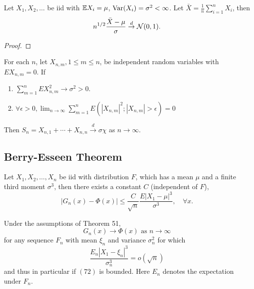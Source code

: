 \begin{theorem}\label{thm:classic-central-limit-theorem}
	Let \(X_1,X_2,\ldots\) be iid with \(\mathbb{E} X_{i}=\mu\), \(\mathrm{Var}(X_{i})=\sigma^2<\infty\). Let \(\bar{X}=\frac{1}{n}\sum_{i=1}^{n}X_{i}\), then
	\begin{equation}
		n^{1/2}\frac{\bar{X}-\mu}{\sigma}\stackrel{d}{\rightarrow}\mathcal{N}(0,1).
	\end{equation}
\end{theorem}

\begin{proof}

\end{proof}

\begin{theorem}
	For each \(n\), let \(X_{n,m},1\leq m\leq n\), be independent random variables with \(EX_{n,m}=0\). If
	\begin{enumerate}
		\item \(\sum_{m=1}^{n}EX_{n,m}^{2} \rightarrow \sigma^{2}>0\).
		\item \(\forall\epsilon>0,\lim_{n\rightarrow\infty}\sum_{m=1}^{n}E\left(\left|X_{n,m}\right|^{2};\left|X_{n,m}\right|>\epsilon\right)=0\)
	\end{enumerate}
	Then \(S_{n}=X_{n,1}+\cdots+X_{n,n}\stackrel{d}{\rightarrow}\sigma\chi\) as \(n\rightarrow\infty\).
\end{theorem}

\subsection{Berry-Esseen Theorem}

\begin{theorem}
	Let \(X_{1},X_{2},\ldots,X_{n}\) be iid with distribution \(F\), which has a mean \(\mu\) and a finite third moment \(\sigma^{3}\), then there exists a constant \(C\) (independent of \(F\)),
	\begin{equation}
		\left|G_{n}(x)-\Phi(x)\right|\leq\frac{C}{\sqrt{n}}\frac{E\left|X_{1}-\mu\right|^{3}}{\sigma^{3}},\quad\forall x.
	\end{equation}
\end{theorem}

\begin{corollary}
	Under the assumptions of Theorem 51,
	\begin{equation*}
		G_{n}(x) \rightarrow \Phi(x) \text { as } n \rightarrow \infty
	\end{equation*}
	for any sequence \(F_{n}\) with mean \(\xi_{n}\) and variance \(\sigma_{n}^{2}\) for which
	\begin{equation*}
		\frac{E_{n}\left|X_{1}-\xi_{n}\right|^{3}}{\sigma_{n}^{3}}=o(\sqrt{n})
	\end{equation*}
	and thus in particular if \((72)\) is bounded. Here \(E_{n}\) denotes the expectation under \(F_{n}\).
\end{corollary}

